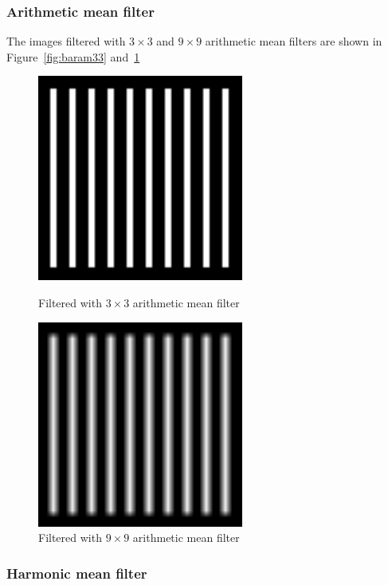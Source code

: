 \documentclass{article}
\begin{document}
\subsubsection{Arithmetic mean filter}

The images filtered with $3 \times 3$ and $9 \times 9$ arithmetic mean filters are shown in Figure~\ref{fig:baram33} and~\ref{fig:baram99}

\begin{figure}[H]
	\captionsetup{justification=centering,margin=1cm}
	\begin{minipage}[b]{0.48\linewidth}
		\centering
		\includegraphics[width=192pt]{../result/task1/arithmetic-mean-3-3.png}
		\caption{Filtered with $3 \times 3$ arithmetic mean filter}
		\label{fig:baram33}
	\end{minipage}
	\begin{minipage}[b]{0.48\linewidth}
		\centering
		\includegraphics[width=192pt]{../result/task1/arithmetic-mean-9-9.png}
		\caption{Filtered with $9 \times 9$ arithmetic mean filter}
		\label{fig:baram99}
	\end{minipage}
\end{figure}


\subsubsection{Harmonic mean filter}
\end{document}
